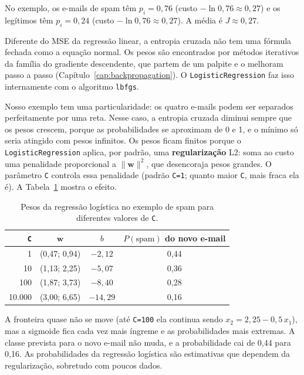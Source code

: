 \documentclass[a4paper,12pt,openany]{book}
\begin{document}
No exemplo, os e-mails de spam têm \(p_i = 0,76\) (custo \(-\ln 0,76 \approx 0,27\)) e os legítimos têm \(p_i = 0,24\) (custo \(-\ln 0,76 \approx 0,27\)). A média é \(J \approx 0,27\).

Diferente do MSE da regressão linear, a entropia cruzada não tem uma fórmula fechada como a equação normal. Os pesos são encontrados por métodos iterativos da família do gradiente descendente, que partem de um palpite e o melhoram passo a passo (Capítulo~\ref{cap:backpropagation}). O \texttt{LogisticRegression} faz isso internamente com o algoritmo \texttt{lbfgs}.

Nosso exemplo tem uma particularidade: os quatro e-mails podem ser separados perfeitamente por uma reta. Nesse caso, a entropia cruzada diminui sempre que os pesos crescem, porque as probabilidades se aproximam de 0 e 1, e o mínimo só seria atingido com pesos infinitos. Os pesos ficam finitos porque o \texttt{LogisticRegression} aplica, por padrão, uma \textbf{regularização} L2: soma ao custo uma penalidade proporcional a \(\|\mathbf{w}\|^2\), que desencoraja pesos grandes. O parâmetro \texttt{C} controla essa penalidade (padrão \texttt{C=1}; quanto maior \texttt{C}, mais fraca ela é). A Tabela~\ref{tab:regularizacao} mostra o efeito.

\begin{table}[H]
\centering
\begin{tabular}{rccc}
\toprule
\textbf{\texttt{C}} & \(\mathbf{w}\) & \(b\) & \textbf{\(P(\text{spam})\) do novo e-mail} \\
\midrule
1 & (0,47; 0,94) & \(-2,12\) & 0,44 \\
10 & (1,13; 2,25) & \(-5,07\) & 0,36 \\
100 & (1,87; 3,73) & \(-8,40\) & 0,28 \\
10.000 & (3,00; 6,65) & \(-14,29\) & 0,16 \\
\bottomrule
\end{tabular}
\caption{Pesos da regressão logística no exemplo de spam para diferentes valores de \texttt{C}.}
\label{tab:regularizacao}
\end{table}

A fronteira quase não se move (até \texttt{C=100} ela continua sendo \(x_2 = 2,25 - 0,5\,x_1\)), mas a sigmoide fica cada vez mais íngreme e as probabilidades mais extremas. A classe prevista para o novo e-mail não muda, e a probabilidade cai de 0,44 para 0,16. As probabilidades da regressão logística são estimativas que dependem da regularização, sobretudo com poucos dados.
\end{document}
